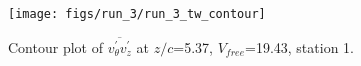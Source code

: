 \begin{figure}[H]
\centering
\texttt{[image: figs/run\_3/run\_3\_tw\_contour]}
\caption{Contour plot of $\overline{v_{\theta}^{\prime} v_{z}^{\prime}}$ at $z/c$=5.37, $V_{free}$=19.43, station 1.}
\label{fig:run_3_tw_contour}
\end{figure}


